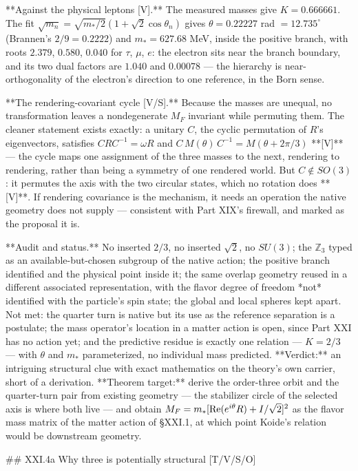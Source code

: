 **Against the physical leptons [V].** The measured masses give $K = 0.666661$. The fit $\sqrt{m_n} = \sqrt{m_*/2}(1+\sqrt2\cos\theta_n)$ gives $\theta = 0.22227$ rad $= 12.735^\circ$ (Brannen's $2/9 = 0.2222$) and $m_* = 627.68$ MeV, inside the positive branch, with roots $2.379$, $0.580$, $0.040$ for $\tau$, $\mu$, $e$: the electron sits near the branch boundary, and its two dual factors are $1.040$ and $0.00078$ — the hierarchy is near-orthogonality of the electron's direction to one reference, in the Born sense.

**The rendering-covariant cycle [V/S].** Because the masses are unequal, no transformation leaves a nondegenerate $M_F$ invariant while permuting them. The cleaner statement exists exactly: a unitary $C$, the cyclic permutation of $R$'s eigenvectors, satisfies $CRC^{-1} = \omega R$ and $C\,M(\theta)\,C^{-1} = M(\theta+2\pi/3)$ **[V]** — the cycle maps one assignment of the three masses to the next, rendering to rendering, rather than being a symmetry of one rendered world. But $C\notin SO(3)$: it permutes the axis with the two circular states, which no rotation does **[V]**. If rendering covariance is the mechanism, it needs an operation the native geometry does not supply — consistent with Part XIX's firewall, and marked as the proposal it is.

**Audit and status.** No inserted $2/3$, no inserted $\sqrt2$, no $SU(3)$; the $\mathbb Z_3$ typed as an available-but-chosen subgroup of the native action; the positive branch identified and the physical point inside it; the same overlap geometry reused in a different associated representation, with the flavor degree of freedom *not* identified with the particle's spin state; the global and local spheres kept apart. Not met: the quarter turn is native but its use as the reference separation is a postulate; the mass operator's location in a matter action is open, since Part XXI has no action yet; and the predictive residue is exactly one relation — $K = 2/3$ — with $\theta$ and $m_*$ parameterized, no individual mass predicted. **Verdict:** an intriguing structural clue with exact mathematics on the theory's own carrier, short of a derivation. **Theorem target:** derive the order-three orbit and the quarter-turn pair from existing geometry — the stabilizer circle of the selected axis is where both live — and obtain $M_F = m_*[{\rm Re}(e^{i\theta}R)+I/\sqrt2]^2$ as the flavor mass matrix of the matter action of §XXI.1, at which point Koide's relation would be downstream geometry.

## XXI.4a Why three is potentially structural [T/V/S/O]

